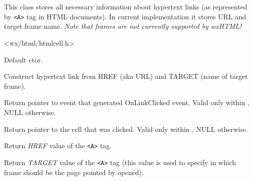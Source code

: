 \section{}\label{wxhtmllinkinfo}

This class stores all necessary information about hypertext
links (as represented by {\tt <A>} tag in HTML documents). In 
current implementation it stores URL and target frame name. 
{\it Note that frames are not currently supported by wxHTML!}




<wx/html/htmlcell.h>




\label{wxhtmllinkinfowxhtmllinkinfo}


Default ctor.


Construct hypertext link from HREF (aka URL) and TARGET (name of target
frame).

\label{wxhtmllinkinfogetevent}


Return pointer to event that generated OnLinkClicked event. Valid
only within ,
NULL otherwise.

\label{wxhtmllinkinfogethtmlcell}


Return pointer to the cell that was clicked. Valid
only within ,
NULL otherwise.


\label{wxhtmllinkinfogethref}


Return {\it HREF} value of the {\tt <A>} tag.

\label{wxhtmllinkinfogettarget}


Return {\it TARGET} value of the {\tt <A>} tag (this value
is used to specify in which frame should be the page pointed
by  opened).

